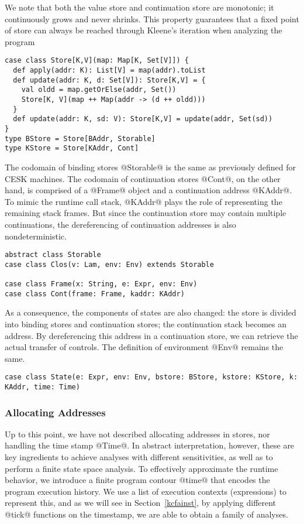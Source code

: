 \documentclass[acmsmall]{acmart}\settopmatter{}
\begin{document}
We note that both the value store and continuation store are monotonic;
it continuously grows and never shrinks. This property guarantees that
a fixed point of store can always be reached through Kleene's
iteration when analyzing the program

\begin{lstlisting}
case class Store[K,V](map: Map[K, Set[V]]) {
  def apply(addr: K): List[V] = map(addr).toList
  def update(addr: K, d: Set[V]): Store[K,V] = {
    val oldd = map.getOrElse(addr, Set())
    Store[K, V](map ++ Map(addr -> (d ++ oldd)))
  }
  def update(addr: K, sd: V): Store[K,V] = update(addr, Set(sd))
}
type BStore = Store[BAddr, Storable]
type KStore = Store[KAddr, Cont]
\end{lstlisting}

The codomain of binding stores @Storable@ is the same as previously defined for CESK 
machines. The codomain of continuation stores @Cont@, on the other hand, is comprised of
a @Frame@ object and a continuation address @KAddr@. To mimic the runtime call stack, 
@KAddr@ plays the role of representing the remaining stack frames.
But since the continuation store may contain multiple continuations, the dereferencing 
of continuation addresses is also nondeterministic.

\begin{lstlisting}
abstract class Storable
case class Clos(v: Lam, env: Env) extends Storable

case class Frame(x: String, e: Expr, env: Env)
case class Cont(frame: Frame, kaddr: KAddr)
\end{lstlisting}

As a consequence, the components of states are also changed: the store is divided
into binding stores and continuation stores; the continuation stack becomes an address.
By dereferencing this address in a continuation store, we can retrieve the actual 
transfer of controls. The definition of environment @Env@ remains the same.

\begin{lstlisting}
case class State(e: Expr, env: Env, bstore: BStore, kstore: KStore, k: KAddr, time: Time)
\end{lstlisting}

\subsubsection{Allocating Addresses}
Up to this point, we have not described allocating addresses in stores,
nor handling the time stamp @Time@.
In abstract interpretation, however, these are key ingredients to achieve
analyses with different sensitivities, as well as to perform a finite
state space analysis\cite{Gilray:2016:ACP:2951913.2951936}.
To effectively approximate the runtime behavior, we introduce a finite
program contour @time@ that encodes the program execution history.
We use a list of execution contexts (expressions) to represent this, and
as we will see in Section~\ref{kcfainst}, by applying different @tick@
functions on the timestamp, we are able to obtain a family of analyses.
\end{document}
